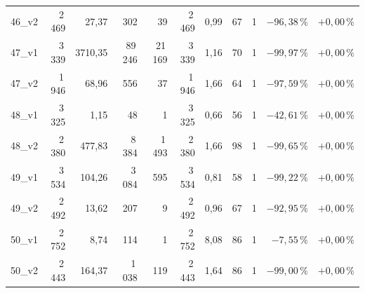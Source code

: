 \begin{longtable}{@{}l rrrr rrrr rr@{}}
  46\_v2 & 2\,469 & 27{,}37 & 302 & 39 & 2\,469 & 0{,}99 & 67 & 1 & $-96{,}38\,\%$ & $+0{,}00\,\%$ \\
  47\_v1 & 3\,339 & 3710{,}35 & 89\,246 & 21\,169 & 3\,339 & 1{,}16 & 70 & 1 & $-99{,}97\,\%$ & $+0{,}00\,\%$ \\
  47\_v2 & 1\,946 & 68{,}96 & 556 & 37 & 1\,946 & 1{,}66 & 64 & 1 & $-97{,}59\,\%$ & $+0{,}00\,\%$ \\
  48\_v1 & 3\,325 & 1{,}15 & 48 & 1 & 3\,325 & 0{,}66 & 56 & 1 & $-42{,}61\,\%$ & $+0{,}00\,\%$ \\
  48\_v2 & 2\,380 & 477{,}83 & 8\,384 & 1\,493 & 2\,380 & 1{,}66 & 98 & 1 & $-99{,}65\,\%$ & $+0{,}00\,\%$ \\
  49\_v1 & 3\,534 & 104{,}26 & 3\,084 & 595 & 3\,534 & 0{,}81 & 58 & 1 & $-99{,}22\,\%$ & $+0{,}00\,\%$ \\
  49\_v2 & 2\,492 & 13{,}62 & 207 & 9 & 2\,492 & 0{,}96 & 67 & 1 & $-92{,}95\,\%$ & $+0{,}00\,\%$ \\
  50\_v1 & 2\,752 & 8{,}74 & 114 & 1 & 2\,752 & 8{,}08 & 86 & 1 & $-7{,}55\,\%$ & $+0{,}00\,\%$ \\
  50\_v2 & 2\,443 & 164{,}37 & 1\,038 & 119 & 2\,443 & 1{,}64 & 86 & 1 & $-99{,}00\,\%$ & $+0{,}00\,\%$ \\
\end{longtable}
\endgroup
